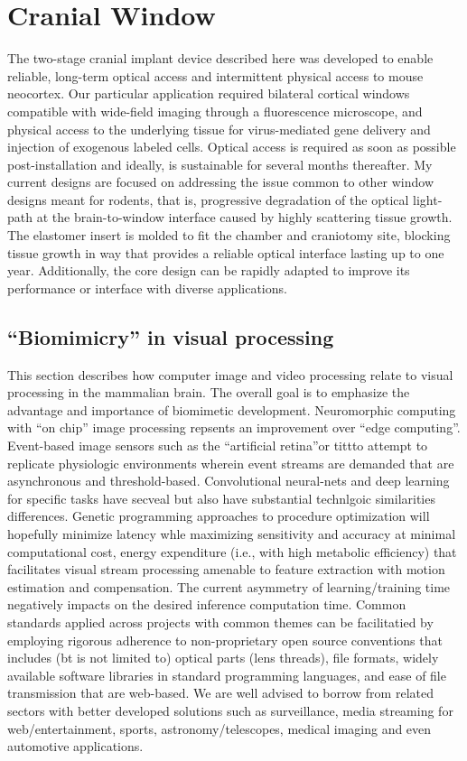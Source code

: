 \section{Cranial Window}
\label{sec:cranial-window}

The two-stage cranial implant device described here was developed to enable reliable, long-term optical access and intermittent physical access to mouse neocortex.
Our particular application required bilateral cortical windows compatible with wide-field imaging through a fluorescence microscope, and physical access to the underlying tissue for virus-mediated gene delivery and injection of exogenous labeled cells.
Optical access is required as soon as possible post-installation and ideally, is sustainable for several months thereafter.
My current designs are focused on addressing the issue common to other window designs meant for rodents, that is, progressive degradation of the optical light-path at the brain-to-window interface caused by highly scattering tissue growth.
The elastomer insert is molded to fit the chamber and craniotomy site, blocking tissue growth in way that provides a reliable optical interface lasting up to one year.
Additionally, the core design can be rapidly adapted to improve its performance or interface with diverse applications.

\subsection{“Biomimicry” in visual processing}
This section describes how computer image and video processing relate to visual processing in the mammalian brain.
The overall goal is to emphasize the advantage and importance of biomimetic development.
Neuromorphic computing with “on chip” image processing repsents an improvement over “edge computing”.
Event-based image sensors such as the “artificial retina”or tittto attempt to replicate physiologic environments  wherein event streams are demanded that are asynchronous and threshold-based.
Convolutional neural-nets and deep learning for specific tasks have secveal but also have substantial technlgoic similarities differences.
Genetic programming approaches to procedure optimization will hopefully minimize latency whle maximizing sensitivity and accuracy at minimal  computational cost, energy expenditure (i.e., with high metabolic efficiency) that facilitates visual stream processing amenable to feature extraction with motion estimation and compensation.
The current asymmetry of learning/training time negatively impacts on the  desired inference computation time.
Common standards applied across projects with common themes can be facilitatied by employing rigorous adherence to non-proprietary open source conventions that includes (bt is not limited to) optical parts (lens threads), file formats, widely available software libraries in standard programming languages, and ease of file transmission that are web-based.
We are well advised to borrow from related sectors with better developed solutions such as surveillance, media streaming for web/entertainment, sports, astronomy/telescopes, medical imaging and even automotive applications.

